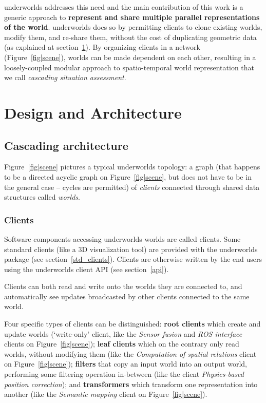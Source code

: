 \documentclass[letterpaper, 10 pt, conference]{ieeeconf}  %
\newcommand{\uwds}{{\sc underworlds}\xspace}
\begin{document}
\uwds addresses this need and the main contribution of this work is a generic
approach to \textbf{represent and share multiple parallel representations of the
world}. \uwds does so by permitting clients to clone existing worlds, modify
them, and re-share them, without the cost of duplicating geometric data (as
explained at section~\ref{design}). By organizing clients in a network
(Figure~\ref{fig|scene}), worlds can be made dependent on each other, resulting
in a loosely-coupled modular approach to spatio-temporal world representation
that we call \emph{cascading situation assessment}.


\section{Design and Architecture}
\label{design}

\subsection{Cascading architecture}

Figure~\ref{fig|scene} pictures a typical \uwds topology: a graph (that
happens to be a directed acyclic graph on Figure~\ref{fig|scene}, but does not
have to be in the general case -- cycles are permitted) of \emph{clients}
connected through shared data structures called \emph{worlds}.

\subsubsection{Clients}

Software components accessing \uwds worlds are called clients. Some standard
clients (like a 3D visualization tool) are provided with the \uwds package (see
section~\ref{std_clients}). Clients are otherwise written by the end users
using the \uwds client API (see section~\ref{api}).

Clients can both read and write onto the worlds they are connected to, and
automatically see updates broadcasted by other clients connected to the same
world.

Four specific types of clients can be distinguished: \textbf{root clients} which
create and update worlds (`write-only' client, like the \emph{Sensor fusion} and
\emph{ROS interface} clients on Figure~\ref{fig|scene}); \textbf{leaf clients}
which on the contrary only read worlds, without modifying them (like the
\emph{Computation of spatial relations} client on Figure~\ref{fig|scene});
\textbf{filters} that copy an input world into an output world, performing
some filtering operation in-between (like the client \textit{Physics-based
position correction}); and \textbf{transformers} which transform one
representation into another (like the \emph{Semantic mapping} client on
Figure~\ref{fig|scene}).
\end{document}
